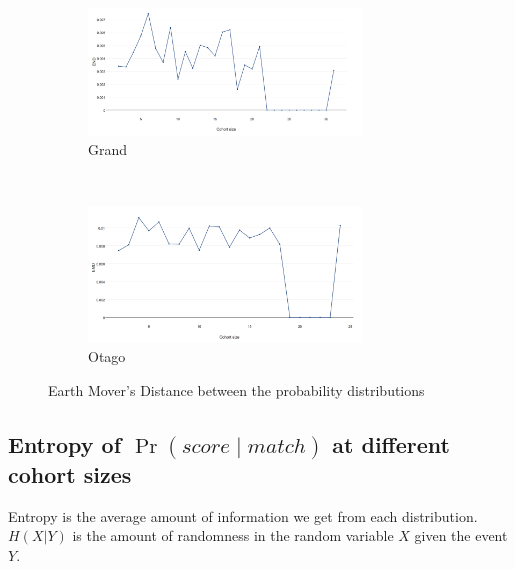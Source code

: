 \begin{figure}[htbp]
  \centering
  \begin{subfigure}[t]{\textwidth}
    \centering
    \includegraphics[width=0.8\textwidth]{dataset/grand/emd}
    \caption{Grand}
    \label{fig:grand_emd} %
  \end{subfigure}%
  \\
  \begin{subfigure}[t]{\textwidth}
    \centering
    \includegraphics[width=0.8\textwidth]{dataset/otago/emd}
    \caption{Otago}
    \label{fig:otago_emd} %
  \end{subfigure}%
  \caption{Earth Mover's Distance between the probability distributions}
  \label{fig:emdist} %
\end{figure}

\subsection{Entropy of $\Pr{(score \mid match)}$ at different cohort sizes}

Entropy is the average amount of information we get from each distribution.
$H(X|Y)$ is the amount of randomness in the random variable $X$ given the event $Y$.

